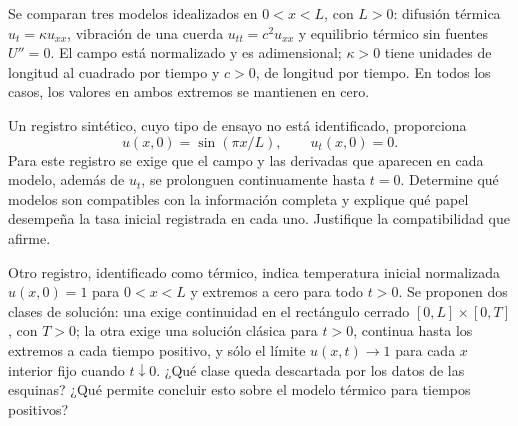 Se comparan tres modelos idealizados en \(0<x<L\), con \(L>0\): difusión térmica \(u_t=\kappa u_{xx}\), vibración de una cuerda \(u_{tt}=c^2u_{xx}\) y equilibrio térmico sin fuentes \(U''=0\). El campo está normalizado y es adimensional; \(\kappa>0\) tiene unidades de longitud al cuadrado por tiempo y \(c>0\), de longitud por tiempo. En todos los casos, los valores en ambos extremos se mantienen en cero.

Un registro sintético, cuyo tipo de ensayo no está identificado, proporciona
\[
u(x,0)=\sin(\pi x/L),\qquad u_t(x,0)=0.
\]
Para este registro se exige que el campo y las derivadas que aparecen en cada modelo, además de \(u_t\), se prolonguen continuamente hasta \(t=0\). Determine qué modelos son compatibles con la información completa y explique qué papel desempeña la tasa inicial registrada en cada uno. Justifique la compatibilidad que afirme.

Otro registro, identificado como térmico, indica temperatura inicial normalizada \(u(x,0)=1\) para \(0<x<L\) y extremos a cero para todo \(t>0\). Se proponen dos clases de solución: una exige continuidad en el rectángulo cerrado \([0,L]\times[0,T]\), con \(T>0\); la otra exige una solución clásica para \(t>0\), continua hasta los extremos a cada tiempo positivo, y sólo el límite \(u(x,t)\to1\) para cada \(x\) interior fijo cuando \(t\downarrow0\). ¿Qué clase queda descartada por los datos de las esquinas? ¿Qué permite concluir esto sobre el modelo térmico para tiempos positivos?
